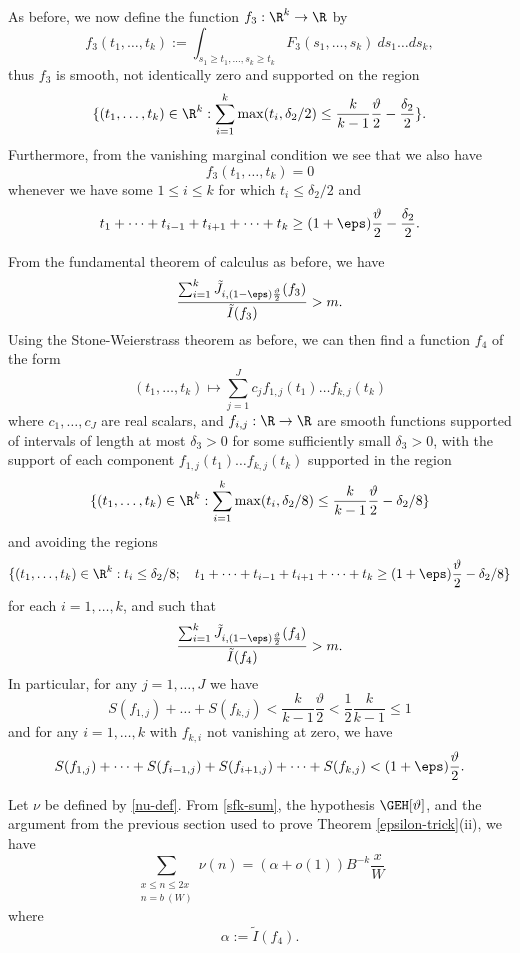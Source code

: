 As before, we now define the function $f_3: \R^k \to \R$ by
$$ f_3(t_1,\dots,t_k) := \int_{s_1 \geq t_1, \dots, s_k \geq t_k} F_3(s_1,\dots,s_k)\ ds_1 \dots ds_k,$$
thus $f_3$ is smooth, not identically zero and supported on the region
$$ \{ (t_1,\dots,t_k) \in \R^k: \sum_{i=1}^k \max(t_i, \delta_2/2) \leq \frac{k}{k-1} \frac{\vartheta}{2} - \frac{\delta_2}{2} \}.$$
Furthermore, from the vanishing marginal condition we see that we also have
$$ f_3(t_1,\dots,t_k) =0 $$
whenever we have some $1 \leq i \leq k$ for which $t_i \leq \delta_2/2$ and
$$ t_1 + \dots + t_{i-1} + t_{i+1} + \dots + t_k \geq (1+\eps) \frac{\vartheta}{2} - \frac{\delta_2}{2}.$$

From the fundamental theorem of calculus as before, we have
$$
\frac{\sum_{i=1}^k \tilde J_{i,(1-\eps) \frac{\vartheta}{2}}(f_3)}{\tilde I(f_3)} > m.
$$
Using the Stone-Weierstrass theorem as before, we can then find a function $f_4$ of the form
\begin{equation}\label{cff-again}
 (t_1,\dots,t_k) \mapsto \sum_{j=1}^J c_j f_{1,j}(t_1) \dots f_{k,j}(t_k)
\end{equation}
where $c_1,\dots,c_J$ are real scalars, and $f_{i,j}: \R \to \R$ are smooth functions supported of intervals of length at most $\delta_3>0$ for some sufficiently small $\delta_3>0$, with the support of each component
$f_{1,j}(t_1) \dots f_{k,j}(t_k)$ supported in the region
$$ \{ (t_1,\dots,t_k) \in \R^k: \sum_{i=1}^k \max(t_i, \delta_2/8) \leq \frac{k}{k-1} \frac{\vartheta}{2} - \delta_2/8 \}$$
and avoiding the regions
$$ \{ (t_1,\dots,t_k) \in \R^k: t_i \leq \delta_2/8; \quad  t_1 + \dots + t_{i-1} + t_{i+1} + \dots + t_k \geq (1+\eps) \frac{\vartheta}{2} - \delta_2/8 \}$$
for each $i=1,\dots,k$, and such that
$$
\frac{\sum_{i=1}^k \tilde J_{i,(1-\eps) \frac{\vartheta}{2}}(f_4)}{\tilde I(f_4)} > m.
$$
In particular, for any $j=1,\dots,J$ we have
\begin{equation}\label{sfk-sum}
S(f_{1,j}) + \dots + S(f_{k,j}) < \frac{k}{k-1} \frac{\vartheta}{2} < \frac{1}{2} \frac{k}{k-1} \leq 1
\end{equation}
and for any $i=1,\dots,k$ with $f_{k,i}$ not vanishing at zero, we have
\begin{equation}\label{sfk-sum-2} 
S(f_{1,j}) + \dots + S(f_{i-1,j}) + S(f_{i+1,j}) + \dots + S(f_{k,j}) < (1+\eps) \frac{\vartheta}{2}.
\end{equation}

Let $\nu$ be defined by \eqref{nu-def}.
From \eqref{sfk-sum}, the hypothesis $\GEH[\vartheta]$, and the argument from the previous section used to prove Theorem \ref{epsilon-trick}(ii), we have
$$ \sum_{\substack{x \leq n \leq 2x\\ n = b\ (W)}} \nu(n) = (\alpha + o(1)) B^{-k} \frac{x}{W}$$
where 
$$ \alpha := \tilde I(f_4).$$

